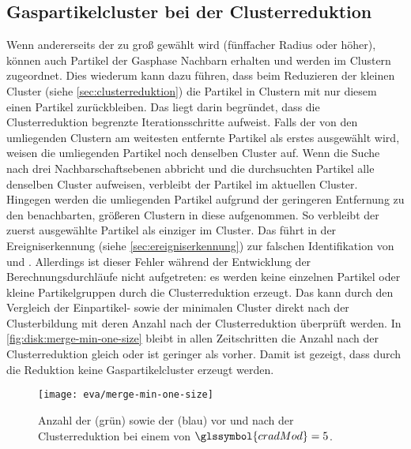 \subsection*{Gaspartikelcluster bei der Clusterreduktion}  %

Wenn andererseits der  zu groß gewählt wird (fünffacher Radius oder höher), können auch Partikel der Gasphase Nachbarn erhalten und werden im \CFD Clustern zugeordnet. Dies wiederum kann dazu führen, dass beim Reduzieren der kleinen Cluster (siehe \autoref{sec:clusterreduktion}) die Partikel in Clustern mit nur diesem einen Partikel zurückbleiben. Das liegt darin begründet, dass die Clusterreduktion begrenzte Iterationsschritte aufweist. Falls der von den umliegenden Clustern am weitesten entfernte Partikel als erstes ausgewählt wird, weisen die umliegenden Partikel noch denselben Cluster auf. Wenn die Suche nach drei Nachbarschaftsebenen abbricht und die durchsuchten Partikel alle denselben Cluster aufweisen, verbleibt der Partikel im aktuellen Cluster. Hingegen werden die umliegenden Partikel aufgrund der geringeren Entfernung zu den benachbarten, größeren Clustern in diese aufgenommen. So verbleibt der zuerst ausgewählte Partikel als einziger im Cluster. Das führt in der Ereigniserkennung (siehe \autoref{sec:ereigniserkennung}) zur falschen Identifikation von  und .
Allerdings ist dieser Fehler während der Entwicklung der Berechnungsdurchläufe nicht aufgetreten: es werden keine einzelnen Partikel oder kleine Partikelgruppen durch die Clusterreduktion erzeugt. Das kann durch den Vergleich der Einpartikel- sowie der minimalen Cluster direkt nach der Clusterbildung mit deren Anzahl nach der Clusterreduktion überprüft werden. In \autoref{fig:disk:merge-min-one-size} bleibt in allen Zeitschritten die Anzahl nach der Clusterreduktion gleich oder ist geringer als vorher. Damit ist gezeigt, dass durch die Reduktion keine Gaspartikelcluster erzeugt werden.

\begin{figure}
	\texttt{[image: eva/merge-min-one-size]}
	\caption{Anzahl der  (grün) sowie der  (blau) vor und nach der Clusterreduktion bei einem  von $\glssymbol{cradMod} = 5$.}\label{fig:disk:merge-min-one-size}
\end{figure}

